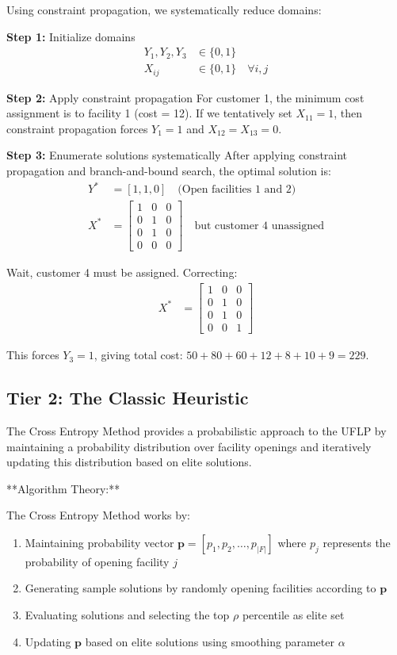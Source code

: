 \documentclass{article}
\begin{document}
Using constraint propagation, we systematically reduce domains:

\textbf{Step 1:} Initialize domains
\begin{align}
Y_1, Y_2, Y_3 &\in \{0,1\}\\
X_{ij} &\in \{0,1\} \quad \forall i,j
\end{align}

\textbf{Step 2:} Apply constraint propagation
For customer 1, the minimum cost assignment is to facility 1 (cost = 12). If we tentatively set $X_{11} = 1$, then constraint propagation forces $Y_1 = 1$ and $X_{12} = X_{13} = 0$.

\textbf{Step 3:} Enumerate solutions systematically
After applying constraint propagation and branch-and-bound search, the optimal solution is:
\begin{align}
Y^* &= [1, 1, 0] \quad \text{(Open facilities 1 and 2)}\\
X^* &= \begin{bmatrix}
1 & 0 & 0\\
0 & 1 & 0\\
0 & 1 & 0\\
0 & 0 & 0
\end{bmatrix} \quad \text{but customer 4 unassigned}
\end{align}

Wait, customer 4 must be assigned. Correcting:
\begin{align}
X^* &= \begin{bmatrix}
1 & 0 & 0\\
0 & 1 & 0\\
0 & 1 & 0\\
0 & 0 & 1
\end{bmatrix}
\end{align}

This forces $Y_3 = 1$, giving total cost: $50 + 80 + 60 + 12 + 8 + 10 + 9 = 229$.

\subsection{Tier 2: The Classic Heuristic}

The Cross Entropy Method provides a probabilistic approach to the UFLP by maintaining a probability distribution over facility openings and iteratively updating this distribution based on elite solutions.

**Algorithm Theory:**

The Cross Entropy Method works by:
\begin{enumerate}
\item Maintaining probability vector $\mathbf{p} = [p_1, p_2, \ldots, p_{|F|}]$ where $p_j$ represents the probability of opening facility $j$
\item Generating sample solutions by randomly opening facilities according to $\mathbf{p}$
\item Evaluating solutions and selecting the top $\rho$ percentile as elite set
\item Updating $\mathbf{p}$ based on elite solutions using smoothing parameter $\alpha$
\end{enumerate}
\end{document}
